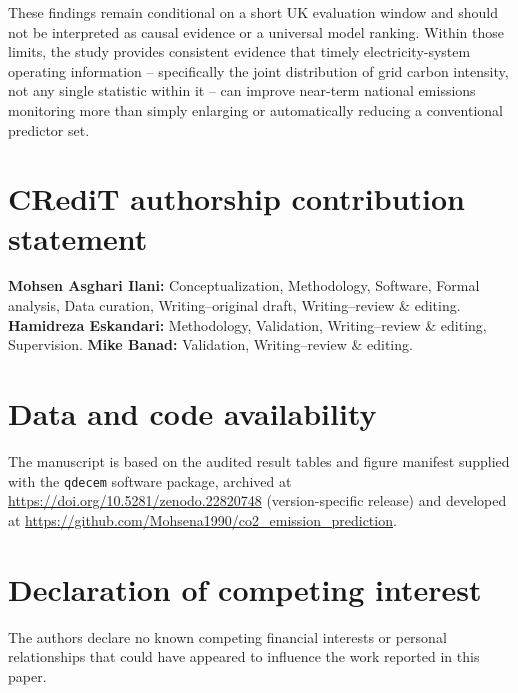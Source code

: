 \documentclass[preprint,12pt]{elsarticle}
\begin{document}
These findings remain conditional on a short UK evaluation window and should not be interpreted as causal evidence or a universal model ranking. Within those limits, the study provides consistent evidence that timely electricity-system operating information -- specifically the joint distribution of grid carbon intensity, not any single statistic within it -- can improve near-term national emissions monitoring more than simply enlarging or automatically reducing a conventional predictor set.

\section*{CRediT authorship contribution statement}
\textbf{Mohsen Asghari Ilani:} Conceptualization, Methodology, Software, Formal analysis, Data curation, Writing--original draft, Writing--review \& editing. \textbf{Hamidreza Eskandari:} Methodology, Validation, Writing--review \& editing, Supervision. \textbf{Mike Banad:} Validation, Writing--review \& editing.

\section*{Data and code availability}
The manuscript is based on the audited result tables and figure manifest supplied with the \texttt{qdecem} software package, archived at \url{https://doi.org/10.5281/zenodo.22820748} (version-specific release) and developed at \url{https://github.com/Mohsena1990/co2_emission_prediction}.

\section*{Declaration of competing interest}
The authors declare no known competing financial interests or personal relationships that could have appeared to influence the work reported in this paper.


\clearpage


\end{document}
